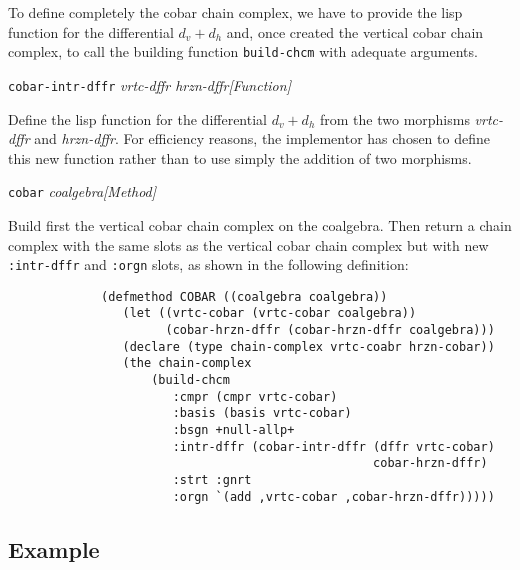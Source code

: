 To define completely the cobar chain complex,
we have to provide the lisp function
for the differential $d_v + d_h$ and, once created the vertical cobar chain complex,
to call the building function {\tt build-chcm} with adequate arguments.
\vskip 0.45cm
{\parindent=0mm
{\leftskip=5mm
{\tt cobar-intr-dffr} {\em vrtc-dffr hrzn-dffr}\hfill {\em [Function]} \par}
{\leftskip=15mm
Define the lisp function for the differential $d_v+d_h$ from the two morphisms
{\em vrtc-dffr} and {\em hrzn-dffr}. For efficiency reasons, the implementor
has chosen to define this new function rather than to use simply
the addition of two morphisms.\par}
{\leftskip=5mm
{\tt cobar} {\em coalgebra}\hfill {\em [Method]} \par}
{\leftskip=15mm
Build first the vertical cobar chain complex on the coalgebra. Then return a chain complex
with the same slots as the vertical cobar chain complex but with new {\tt :intr-dffr}
and  {\tt :orgn} slots, as shown in the following definition: \par}
}
\newpage
{\footnotesize\begin{verbatim}
             (defmethod COBAR ((coalgebra coalgebra))
                (let ((vrtc-cobar (vrtc-cobar coalgebra))
                      (cobar-hrzn-dffr (cobar-hrzn-dffr coalgebra)))
                (declare (type chain-complex vrtc-coabr hrzn-cobar))
                (the chain-complex
                    (build-chcm
                       :cmpr (cmpr vrtc-cobar)
                       :basis (basis vrtc-cobar)
                       :bsgn +null-allp+
                       :intr-dffr (cobar-intr-dffr (dffr vrtc-cobar)
                                                   cobar-hrzn-dffr)
                       :strt :gnrt
                       :orgn `(add ,vrtc-cobar ,cobar-hrzn-dffr)))))
\end{verbatim}}

\subsection* {Example}

